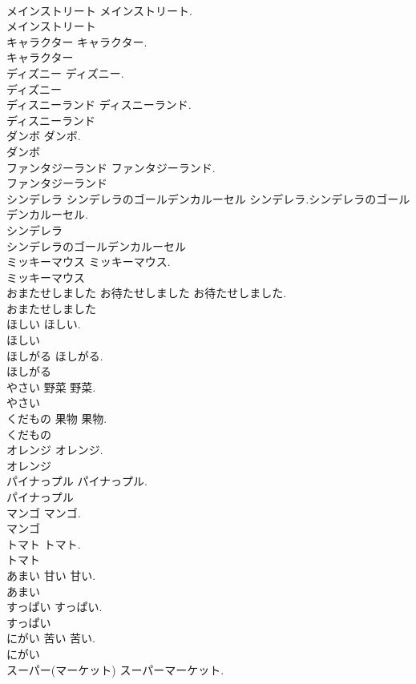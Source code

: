 \documentclass[8pt]{extreport}
\begin{document}
\begin{CJK}{UTF8}{min}
\\	メインストリート		メインストリート.	
\\	メインストリート
\\	キャラクター		キャラクター.	
\\	キャラクター
\\	ディズニー		ディズニー.	
\\	ディズニー
\\	ディスニーランド		ディスニーランド.	
\\	ディスニーランド
\\	ダンボ		ダンボ.	
\\	ダンボ
\\	ファンタジーランド		ファンタジーランド.	
\\	ファンタジーランド
\\	シンデレラ シンデレラのゴールデンカルーセル		シンデレラ.シンデレラのゴールデンカルーセル.	
\\	シンデレラ
\\	シンデレラのゴールデンカルーセル
\\	ミッキーマウス		ミッキーマウス.	
\\	ミッキーマウス
\\	おまたせしました	お待たせしました	お待たせしました.	
\\	おまたせしました
\\	ほしい		ほしい.	
\\	ほしい
\\	ほしがる		ほしがる.	
\\	ほしがる
\\	やさい	野菜	野菜.	
\\	やさい
\\	くだもの	果物	果物.	
\\	くだもの
\\	オレンジ		オレンジ.	
\\	オレンジ
\\	パイナっプル		パイナっプル.	
\\	パイナっプル
\\	マンゴ		マンゴ.	
\\	マンゴ
\\	トマト		トマト.	
\\	トマト
\\	あまい	甘い	甘い.	
\\	あまい
\\	すっぱい		すっぱい.	
\\	すっぱい
\\	にがい	苦い	苦い.	
\\	にがい
\\	スーパー(マーケット)		スーパーマーケット.	

\end{CJK}
\end{document}
